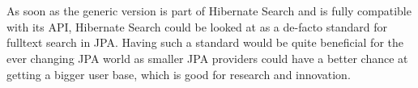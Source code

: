 \\\\
As soon as the generic version is part of Hibernate Search and is fully compatible with its API, Hibernate Search could be looked at as a de-facto standard for fulltext search in JPA. Having such a standard would be quite beneficial for the ever changing JPA world as smaller JPA providers could have a better chance at getting a bigger user base, which is good for research and innovation.

\pagebreak
~